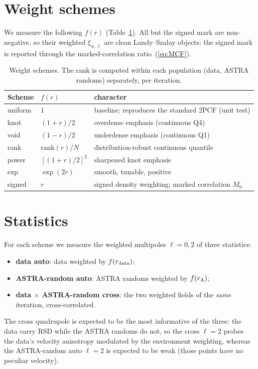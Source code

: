 \documentclass[11pt]{article}
\newcommand{\rpar}{r}
\begin{document}
\section{Weight schemes}
We measure the following $f(\rpar)$ (Table~\ref{tab:weights}).  All but the signed
mark are non-negative, so their weighted $\xi_{w,\ell}$ are clean Landy--Szalay
objects; the signed mark is reported through the marked-correlation
ratio~(\ref{eq:MCF}).
\begin{table}[h]
  \centering
  \begin{tabular}{lll}
    \toprule
    Scheme & $f(\rpar)$ & character \\
    \midrule
    uniform & $1$ & baseline; reproduces the standard 2PCF (unit test) \\
    knot    & $(1+\rpar)/2$ & overdense emphasis (continuous Q4) \\
    void    & $(1-\rpar)/2$ & underdense emphasis (continuous Q1) \\
    rank    & $\mathrm{rank}(\rpar)/N$ & distribution-robust continuous quantile \\
    power   & $[(1+\rpar)/2]^2$ & sharpened knot emphasis \\
    exp     & $\exp(2\rpar)$ & smooth, tunable, positive \\
    signed  & $\rpar$ & signed density weighting; marked correlation $M_0$ \\
    \bottomrule
  \end{tabular}
  \caption{Weight schemes. The rank is computed within each population
  (data, ASTRA randoms) separately, per iteration.}
  \label{tab:weights}
\end{table}

\section{Statistics}
For each scheme we measure the weighted multipoles $\ell=0,2$ of three statistics:
\begin{itemize}
  \item \textbf{data auto}: data weighted by $f(\rpar_{\rm data})$;
  \item \textbf{ASTRA-random auto}: ASTRA randoms weighted by $f(\rpar_{\rm A})$;
  \item \textbf{data $\times$ ASTRA-random cross}: the two weighted fields of the
        \emph{same} iteration, cross-correlated.
\end{itemize}
The cross quadrupole is expected to be the most informative of the three: the data
carry RSD while the ASTRA randoms do not, so the cross $\ell=2$ probes the data's
velocity anisotropy modulated by the environment weighting, whereas the
ASTRA-random auto $\ell=2$ is expected to be weak (those points have no peculiar
velocity).
\end{document}
